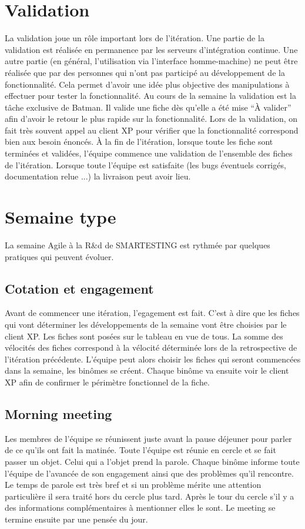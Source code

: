 \section{Validation}
La validation joue un rôle important lors de l'itération. Une partie de la validation est réalisée en permanence par les serveurs d'intégration continue. Une autre partie (en général, l'utilisation via l'interface homme-machine) ne peut être réalisée que par des personnes qui n'ont pas participé au développement de la fonctionnalité. Cela permet d'avoir une idée plus objective des manipulations à effectuer pour tester la fonctionnalité. Au cours de la semaine la validation est la tâche exclusive de Batman. Il valide une fiche dès qu'elle a été mise ``À valider'' afin d'avoir le retour le plus rapide sur la fonctionnalité. Lors de la validation, on fait très souvent appel au client XP pour vérifier que la fonctionnalité correspond bien aux besoin énoncés. À la fin de l'itération, lorsque toute les fiche sont terminées et validées, l'équipe commence une validation de l'ensemble des fiches de l'itération. Lorsque toute l'équipe est satisfaite (les bugs éventuels corrigés, documentation relue ...) la livraison peut avoir lieu.

\section{Semaine type}
La semaine Agile à la R\&d de SMARTESTING est rythmée par quelques pratiques qui peuvent évoluer.
\subsection*{Cotation et engagement}
Avant de commencer une itération, l'egagement est fait. C'est à dire que les fiches qui vont déterminer les développements de la semaine vont être choisies par le client XP. Les fiches sont posées sur le tableau en vue de tous. La somme des vélocités des fiches correspond à la vélocité déterminée lors de la retrospective de l'itération précédente. L'équipe peut alors choisir les fiches qui seront commencées dans la semaine, les binômes se créent. Chaque binôme va ensuite voir le client XP afin de confirmer le périmètre fonctionnel de la fiche. 

\subsection{Morning meeting}
Les membres de l'équipe se réunissent juste avant la pause déjeuner pour parler de ce qu'ils ont fait la matinée. Toute l'équipe est réunie en cercle et se fait passer un objet. Celui qui a l'objet prend la parole. Chaque binôme informe toute l'équipe de l'avancée de son engagement ainsi que des problèmes qu'il rencontre. Le temps de parole est très bref et si un problème mérite une attention particulière il sera traité hors du cercle plus tard. Après le tour du cercle s'il y a des informations complémentaires à mentionner elles le sont. Le meeting se termine ensuite par une pensée du jour.

